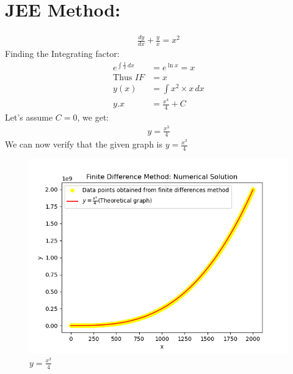 \documentclass[journal]{IEEEtran}
\begin{document}
\section*{JEE Method:}
\begin{align}
    \frac{dy}{dx}+\frac{y}{x}=x^2
\end{align}
Finding the Integrating factor:
\begin{align}
e^{\int \frac{1}{x} \, dx} &=e^{\ln{x}}=x\\
\text{Thus } IF &= x \\
y(x)&=\int x^2\times x\, dx\\
y.x &= \frac{x^4}{4}+C    
\end{align}
Let's assume $C=0$, we get:\\
\begin{align}
    y=\frac{x^3}{4}
\end{align}
We can now verify that the given graph is $y=\frac{x^3}{4}$


\begin{figure}[h]  %
  \centering  %
  \includegraphics[width=\columnwidth]{figs/de1.png}  
  \caption{$y=\frac{x^3}{4}$}
  \label{fig:example}  %
\end{figure}
\end{document}
